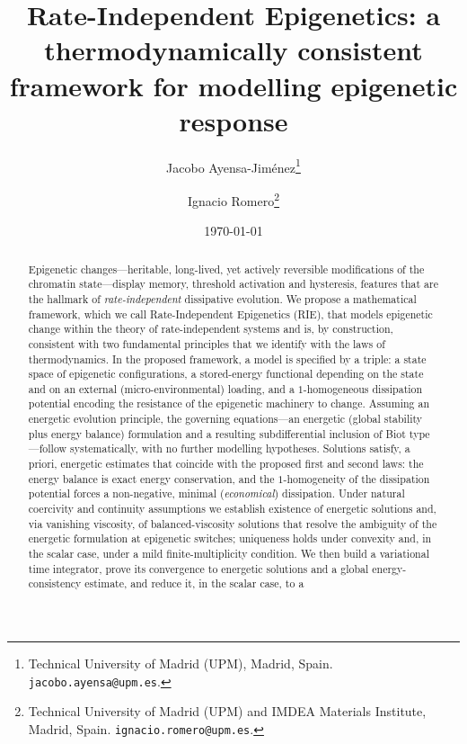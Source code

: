 \documentclass[11pt,a4paper]{article}
\theoremstyle{plain}
\theoremstyle{definition}
\begin{document}
\title{\bfseries Rate-Independent Epigenetics: a thermodynamically
consistent framework for modelling epigenetic response}

\author{Jacobo Ayensa-Jim\'enez\thanks{Technical University of Madrid
(UPM), Madrid, Spain. \texttt{jacobo.ayensa@upm.es}.}
\and
Ignacio Romero\thanks{Technical University of Madrid (UPM) and IMDEA
Materials Institute, Madrid, Spain. \texttt{ignacio.romero@upm.es}.}}

\date{\today}

\maketitle

\begin{abstract}
Epigenetic changes---heritable, long-lived, yet actively reversible
modifications of the chromatin state---display memory, threshold
activation and hysteresis, features that are the hallmark of
\emph{rate-independent} dissipative evolution. We propose a
mathematical framework, which we call Rate-Independent Epigenetics
(RIE), that models epigenetic change within the theory of
rate-independent systems and is, by construction, consistent with two fundamental principles that we identify with the laws of thermodynamics. In the proposed framework, a model is specified by a triple: a state
space of epigenetic configurations, a stored-energy functional
depending on the state and on an external (micro-environmental)
loading, and a $1$-homogeneous dissipation potential encoding the
resistance of the epigenetic machinery to change. Assuming an
energetic evolution principle, the governing equations---an energetic
(global stability plus energy balance) formulation and a resulting
subdifferential inclusion of Biot type---follow systematically, with
no further modelling hypotheses. Solutions satisfy, a priori, energetic
estimates that coincide with the proposed first and second laws: the energy
balance is exact energy conservation, and the $1$-homogeneity of the
dissipation potential forces a non-negative, minimal (\emph{economical})
dissipation. Under natural coercivity and continuity assumptions we
establish existence of energetic solutions and, via vanishing
viscosity, of balanced-viscosity solutions that resolve the ambiguity
of the energetic formulation at epigenetic switches; uniqueness holds
under convexity and, in the scalar case, under a mild
finite-multiplicity condition. We then build a variational time
integrator, prove its convergence to energetic solutions and a global
energy-consistency estimate, and reduce it, in the scalar case, to a

\end{abstract}
\end{document}

